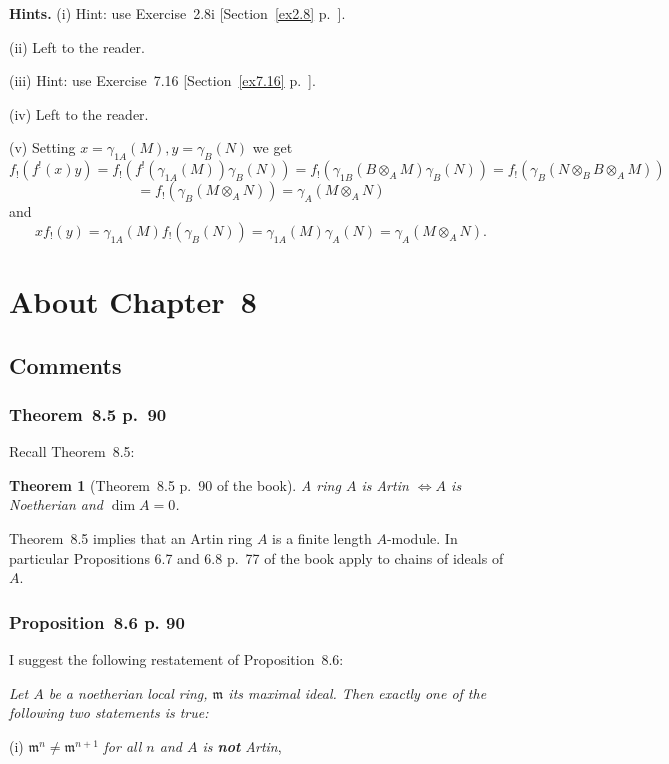 \documentclass[12pt,letterpaper]{article}%
\newcommand{\mf}{\mathfrak}
\newcommand{\mmm}{\mf m}
\newcommand{\nn}{\noindent}
\newtheorem{thm}{Theorem}%
\begin{document}
\nn\textbf{Hints.} (i) Hint: use Exercise~2.8i [Section~\ref{ex2.8} p.~\pageref{ex2.8}].

\nn(ii) Left to the reader.

\nn(iii) Hint: use Exercise~7.16 [Section~\ref{ex7.16} p.~\pageref{ex7.16}].

\nn(iv) Left to the reader.

\nn(v) Setting $x=\gamma_{1A}(M),y=\gamma_B(N)$ we get 
$$
f_!(f^!(x)y)=f_!(f^!(\gamma_{1A}(M))\gamma_B(N))=f_!(\gamma_{1B}(B\otimes_AM)\gamma_B(N))=
f_!(\gamma_B(N\otimes_BB\otimes_AM))
$$ 
$$
=f_!(\gamma_B(M\otimes_AN))=\gamma_A(M\otimes_AN)
$$ 
and 
$$
xf_!(y)=\gamma_{1A}(M)f_!(\gamma_B(N))=\gamma_{1A}(M)\gamma_A(N)=\gamma_A(M\otimes_AN).
$$

\newpage

\section{About Chapter~8}%

\subsection{Comments}%

\subsubsection{Theorem~8.5 p.~90}\label{s8.5}%

Recall Theorem~8.5:

\begin{thm}[Theorem~8.5 p.~90 of the book]\label{t8.5}
A ring $A$ is Artin $\iff A$ is Noetherian and $\dim A=0$.
\end{thm}

Theorem~8.5 implies that an Artin ring $A$ is a finite length $A$-module. In particular Propositions 6.7 and 6.8 p.~77 of the book apply to chains of ideals of $A$.

\subsubsection{Proposition~8.6 p. 90}\label{p8.6}%

I suggest the following restatement of Proposition~8.6:

\nn\emph{Let $A$ be a noetherian local ring, $\mmm$ its maximal ideal. Then exactly one of the following two statements is true:}

\nn(i) $\mmm^n\ne\mmm^{n+1}$ \emph{for all $n$ and $A$ is \textbf{not} Artin},
\end{document}

